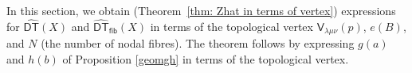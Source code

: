 \documentclass{amsart}
\theoremstyle{definition}
\newcommand{\CC} {\mathbb{C}}          %
\newcommand{\ZZ} {\mathbb{Z}}		%
\newcommand{\PP} {\mathbb{P}}
\renewcommand{\O}{\mathcal{O}}
\newcommand{\sfV}{\mathsf{V}}
\newcommand{\Hilb}{\operatorname{Hilb}}
\newcommand{\Tot}{\operatorname{Tot}}
\newcommand{\DT}{\mathsf{DT}}
\newcommand{\DThat}{\widehat{\DT}}
\newcommand{\fiber}{\mathsf{fib}}
\begin{document}


\begin{comment}
Let $\beta = B+dF \in H_2(S)$. Denote by $X = \Tot(K_S)$ the total space of the canonical bundle over $S$. Then $X$ is a non-compact Calabi-Yau 3-fold. Consider the Hilbert scheme
$$
\Hilb^{\beta,n}(X) = \{ Z \subset X \ : \ [Z] = \beta, \ \chi(\O_Z) = n\}
$$
of proper subschemes $Z \subset X$ with fixed homology class and
holomorphic Euler characteristic. K.~Behrend associates to any
$\CC$-scheme of finite type $Y$ a constructible function $\nu : Y
\rightarrow \ZZ$ \cite{Behrend-micro}. Applied to $\Hilb^{\beta,n}(X)$, the
Donaldson-Thomas invariants of $X$ can be defined as\footnote{If $X$
is a \emph{compact} Calabi-Yau 3-fold, R.P.~Thomas's original
definition of the DT invariant is the degree of the virtual cycle of
$\Hilb^{\beta,n}(X)$ \cite{Tho}. Behrend showed this is the same as
$e(\Hilb^{\beta,n}(X),\nu)$ \cite{Behrend-micro}. The advantage of the
definition by means of virtual cycles is that the construction works
relative to a base. This implies deformation invariance of the
invariants.}
$$
\DT_{\beta,n}(X) := \int_{\Hilb^{\beta,n}(X)} \nu \, de := \sum_{k \in \ZZ} k \, e(\nu^{-1}(\{k\})),
$$
where $e(\cdot)$ denotes topological Euler characteristic. Many of the key properties of DT invariants are already captured by the more classical Euler characteristic version\footnote{From the point of view of \cite{JS, Bri}, there are two natural integration maps on the semi-classical Hall-algebra. One corresponds to weighing by the Behrend function. The other corresponds to weighing by the ``trivial'' constant constructible function 1. The former gives rise to $\DT(X)$ and the latter to $\DThat (X)$.}
$$
\DThat _{\beta,n}(X) := \int_{\Hilb^{\beta,n}(X)} 1 \, de = e(\Hilb^{\beta,n}(X)).
$$
\end{comment}



In this section, we obtain (Theorem~\ref{thm: Zhat in terms of
vertex}) expressions for $\DThat (X)$ and $\DThat_{\fiber }(X)$ in
terms of the topological vertex $\sfV_{\lambda\mu\nu}(p)$, $e(B)$, and
$N$ (the number of nodal fibres). The theorem follows by expressing
$g(a)$ and $h(b)$ of Proposition \ref{geomgh} in terms of the
topological vertex.
\end{document}

